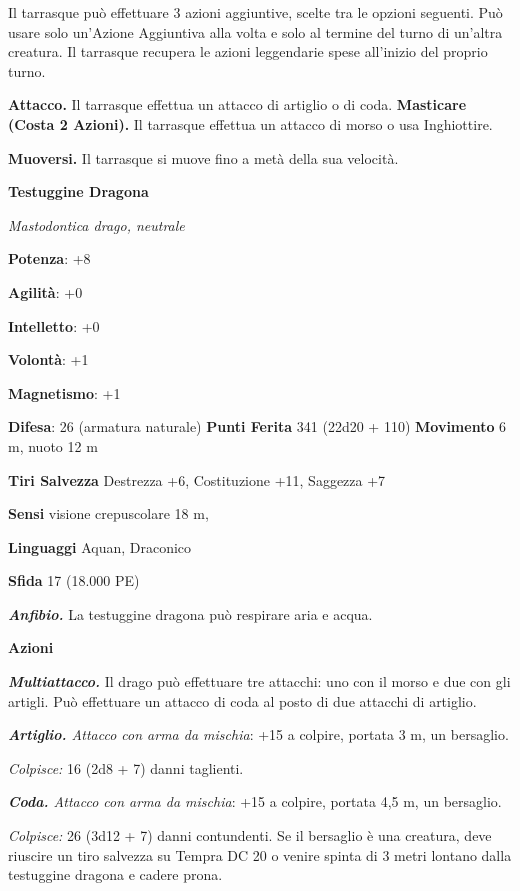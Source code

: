 \begin{multicols}{2}
Il tarrasque può effettuare 3 azioni aggiuntive, scelte tra le opzioni
seguenti. Può usare solo un'Azione Aggiuntiva alla volta e solo al
termine del turno di un'altra creatura. Il tarrasque recupera le azioni
leggendarie spese all'inizio del proprio turno.

\textbf{Attacco.} Il tarrasque effettua un attacco di artiglio o di
coda. \textbf{Masticare (Costa 2 Azioni).} Il tarrasque effettua un
attacco di morso o usa Inghiottire.

\textbf{Muoversi.} Il tarrasque si muove fino a metà della sua velocità.




\textbf{Testuggine Dragona}

\emph{Mastodontica drago, neutrale}

\textbf{Potenza}: +8

\textbf{Agilità}: +0

\textbf{Intelletto}: +0

\textbf{Volontà}: +1

\textbf{Magnetismo}: +1

\textbf{Difesa}: 26 (armatura naturale) \textbf{Punti Ferita}
341 (22d20 + 110) \textbf{Movimento} 6 m, nuoto 12 m

\textbf{Tiri Salvezza} Destrezza +6, Costituzione +11, Saggezza +7

\textbf{Sensi} visione crepuscolare 18 m, 

\textbf{Linguaggi} Aquan, Draconico

\textbf{Sfida} 17 (18.000 PE)

\emph{\textbf{Anfibio.}} La testuggine dragona può respirare aria e
acqua.

\textbf{Azioni}

\emph{\textbf{Multiattacco.}} Il drago può effettuare tre attacchi: uno
con il morso e due con gli artigli. Può effettuare un attacco di coda al
posto di due attacchi di artiglio.

\emph{\textbf{Artiglio.} Attacco con arma da mischia}: +15 a colpire,
portata 3 m, un bersaglio.

\emph{Colpisce:} 16 (2d8 + 7) danni taglienti.

\emph{\textbf{Coda.} Attacco con arma da mischia}: +15 a colpire,
portata 4,5 m, un bersaglio.

\emph{Colpisce:} 26 (3d12 + 7) danni contundenti. Se il bersaglio è una
creatura, deve riuscire un tiro salvezza su Tempra DC 20 o venire spinta
di 3 metri lontano dalla testuggine dragona e cadere prona.


\end{multicols}
